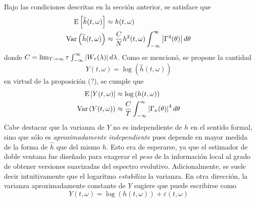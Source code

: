 Bajo las condiciones descritas en la sección anterior, se satisface que
%
\begin{align*}
\mathrm{E}\left[ \widehat{h}(t,\omega) \right] &\approx h(t,\omega) \\
\mathrm{Var}\left( \widehat{h}(t,\omega) \right) &\approx \frac{C}{N} h^{2}(t,\omega) \int_{-\infty}^{\infty} \left| \Gamma^{4}(\theta) \right| d\theta
\end{align*}
%
donde $C = \lim_{T\rightarrow \infty} \tau \int_{-\infty}^{\infty} \left| W_\tau(\lambda) \right| d\lambda$.
%
Como se mencionó, se propone la cantidad 
\begin{equation}
Y(t,\omega) = \log\left(\widehat{h}(t,\omega)\right)
\end{equation}
en virtud de la proposición (?), se cumple que
\begin{align}
\mathrm{E}\left[ Y(t,\omega) \right] &\approx \log\left(h(t,\omega)\right) \\
\mathrm{Var}\left( Y(t,\omega) \right) &\approx \frac{C}{T} \int_{-\infty}^{\infty} \left| \Gamma_\kappa(\theta) \right|^{4} d\theta \\
\end{align}
Cabe destacar que la varianza de $Y$ no es independiente de $h$ en el sentido formal, sino que sólo es \textit{aproximadamente independiente} pues depende en mayor medida de la forma de $\widehat{h}$ que del mismo $h$.
%
Esto era de esperarse, ya que el estimador de doble ventana fue diseñado para exagerar el \textit{peso} de la información local al grado de obtener versiones suavizadas del espectro evolutivo. 
%
Adicionalmente, se suele decir intuitivamente que el logaritmo \textit{estabiliza} la varianza. 
%
En otra dirección, la varianza aproximadamente constante de $Y$ sugiere que puede escribirse como
\begin{equation}
Y(t,\omega) = \log\left(h(t,\omega) \right) + \varepsilon(t,\omega)
\label{ye}
\end{equation}

